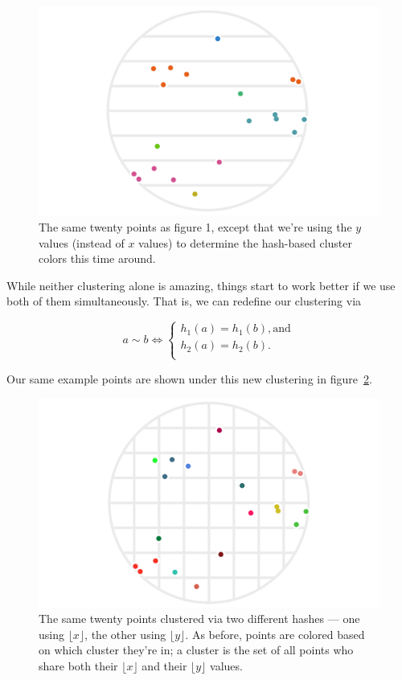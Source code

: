 \documentclass[20pt,]{extarticle}
\newcommand{\smallscrneg}{}
\begin{document}
\begin{figure}
\centering
\includegraphics{images/lsh_image2.png}
\caption{The same twenty points as figure 1, except that we're using the
\(y\) values (instead of \(x\) values) to determine the hash-based
cluster colors this time around.}\label{fig:fig2}
\end{figure}

While neither clustering alone is amazing, things start to work better
if we use both of them simultaneously. That is, we can redefine our
clustering via

\begin{equation} a \sim b \iff
\begin{cases}
h_1(a) = h_1(b), \text{and} \\
h_2(a) = h_2(b). \\
\end{cases} \smallscrneg
\label{eq:eq1}\end{equation}

Our same example points are shown under this new clustering in
figure~\ref{fig:fig3}.

\begin{figure}
\centering
\includegraphics{images/lsh_image3.png}
\caption{The same twenty points clustered via two different hashes ---
one using \(\lfloor x\rfloor\), the other using \(\lfloor y\rfloor.\) As
before, points are colored based on which cluster they're in; a cluster
is the set of all points who share both their \(\lfloor x\rfloor\) and
their \(\lfloor y\rfloor\) values.}\label{fig:fig3}
\end{figure}
\end{document}
